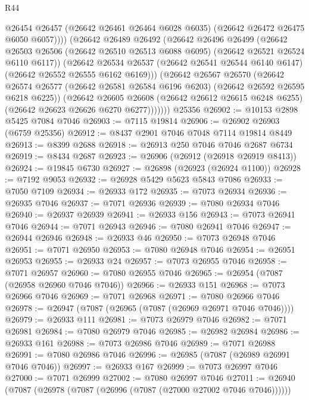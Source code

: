\begin{lexlean}{R44}
\begin{coremodule}
{                @26454
                @26457
                (@26642 @26461 @26464 @6028 @6035)
                (@26642 @26472 @26475 @6050 @6057))))
          (@26642
            @26489
            @26492
            (@26642
              @26496
              @26499
              (@26642
                @26503
                @26506
                (@26642 @26510 @26513 @6088 @6095)
                (@26642 @26521 @26524 @6110 @6117))
              (@26642
                @26534
                @26537
                (@26642 @26541 @26544 @6140 @6147)
                (@26642 @26552 @26555 @6162 @6169)))
            (@26642
              @26567
              @26570
              (@26642
                @26574
                @26577
                (@26642 @26581 @26584 @6196 @6203)
                (@26642 @26592 @26595 @6218 @6225))
              (@26642
                @26605
                @26608
                (@26642 @26612 @26615 @6248 @6255)
                (@26642 @26623 @26626 @6270 @6277)))))))
    @25356
@26902 := @10153 @2898 @5425 @7084 @7046
@26903 := @7115 @19814
@26906 := @26902 @26903 (@6759 @25356)
@26912 := @8437 @2901 @7046 @7048 @7114 @19814 @8449
@26913 := @8399 @2688
@26918 := @26913 @250 @7046 @7046 @2687 @6734
@26919 := @8434 @2687
@26923 := @26906 (@26912 (@26918 @26919 @8413))
@26924 := @19845 @6730
@26927 := @26898 (@26923 (@26924 @1100))
@26928 := @7192 @9053
@26932 := @26928 @5429 @5623 @5843 @7086
@26933 := @7050 @7109
@26934 := @26933 @172
@26935 := @7073 @26934
@26936 := @26935 @7046
@26937 := @7071 @26936
@26939 := @7080 @26934 @7046
@26940 := @26937 @26939
@26941 := @26933 @156
@26943 := @7073 @26941 @7046
@26944 := @7071 @26943
@26946 := @7080 @26941 @7046
@26947 := @26944 @26946
@26948 := @26933 @46
@26950 := @7073 @26948 @7046
@26951 := @7071 @26950
@26953 := @7080 @26948 @7046
@26954 := @26951 @26953
@26955 := @26933 @24
@26957 := @7073 @26955 @7046
@26958 := @7071 @26957
@26960 := @7080 @26955 @7046
@26965 := @26954 (@7087 (@26958 @26960 @7046 @7046))
@26966 := @26933 @151
@26968 := @7073 @26966 @7046
@26969 := @7071 @26968
@26971 := @7080 @26966 @7046
@26978 := @26947 (@7087 (@26965 (@7087 (@26969 @26971 @7046 @7046))))
@26979 := @26933 @111
@26981 := @7073 @26979 @7046
@26982 := @7071 @26981
@26984 := @7080 @26979 @7046
@26985 := @26982 @26984
@26986 := @26933 @161
@26988 := @7073 @26986 @7046
@26989 := @7071 @26988
@26991 := @7080 @26986 @7046
@26996 := @26985 (@7087 (@26989 @26991 @7046 @7046))
@26997 := @26933 @167
@26999 := @7073 @26997 @7046
@27000 := @7071 @26999
@27002 := @7080 @26997 @7046
@27011 := @26940 (@7087 (@26978 (@7087 (@26996 (@7087 (@27000 @27002 @7046 @7046))))))
}
\end{coremodule}
\end{lexlean}
